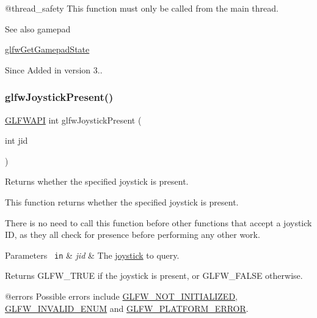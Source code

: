 @thread\+\_\+safety This function must only be called from the main thread.

\begin{DoxySeeAlso}{See also}
gamepad 

\mbox{\hyperlink{group__input_ga6e138d3b0761546f5a12546f367501d6}{glfw\+Get\+Gamepad\+State}}
\end{DoxySeeAlso}
\begin{DoxySince}{Since}
Added in version 3.. 
\end{DoxySince}
\mbox{\label{group__input_gacb1b7dfd79df673d48814c06fc436eff}} 
\subsubsection{\texorpdfstring{glfwJoystickPresent()}{glfwJoystickPresent()}}
{\footnotesize\ttfamily \mbox{\hyperlink{glfw3_8h_a56da5036b2cc259351ae22fd6439bb47}{G\+L\+F\+W\+A\+PI}} int glfw\+Joystick\+Present (\begin{DoxyParamCaption}\item[{int}]{jid }\end{DoxyParamCaption})}



Returns whether the specified joystick is present. 

This function returns whether the specified joystick is present.

There is no need to call this function before other functions that accept a joystick ID, as they all check for presence before performing any other work.


\begin{DoxyParams}[1]{Parameters}
\mbox{\texttt{ in}}  & {\em jid} & The \mbox{\hyperlink{group__joysticks}{joystick}} to query. \\
\hline
\end{DoxyParams}
\begin{DoxyReturn}{Returns}
{\ttfamily G\+L\+F\+W\+\_\+\+T\+R\+UE} if the joystick is present, or {\ttfamily G\+L\+F\+W\+\_\+\+F\+A\+L\+SE} otherwise.
\end{DoxyReturn}
@errors Possible errors include \mbox{\hyperlink{group__errors_ga2374ee02c177f12e1fa76ff3ed15e14a}{G\+L\+F\+W\+\_\+\+N\+O\+T\+\_\+\+I\+N\+I\+T\+I\+A\+L\+I\+Z\+ED}}, \mbox{\hyperlink{group__errors_ga76f6bb9c4eea73db675f096b404593ce}{G\+L\+F\+W\+\_\+\+I\+N\+V\+A\+L\+I\+D\+\_\+\+E\+N\+UM}} and \mbox{\hyperlink{group__errors_gad44162d78100ea5e87cdd38426b8c7a1}{G\+L\+F\+W\+\_\+\+P\+L\+A\+T\+F\+O\+R\+M\+\_\+\+E\+R\+R\+OR}}.

